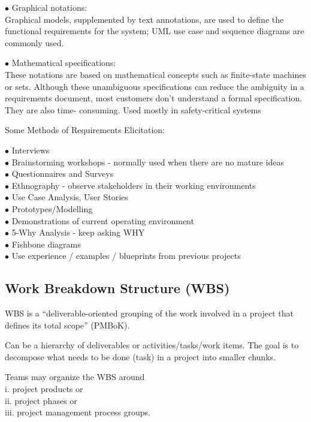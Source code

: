 \documentclass[]{project_plan}
\newcommand{\bulletPoint}{\hspace{-3.1pt}$\bullet$ \hspace{5pt}}
\begin{document}
\bulletPoint Graphical notations:\\
Graphical models, supplemented by text annotations, are used to define the functional
requirements for the system; UML use case and sequence diagrams are commonly used.

\bulletPoint Mathematical specifications:\\
These notations are based on mathematical concepts such as finite-state machines or sets.
Although these unambiguous specifications can reduce the ambiguity in a requirements
document, most customers don’t understand a formal specification. They are also time-
consuming. Used mostly in safety-critical systems

Some Methods of Requirements Elicitation:

\bulletPoint Interviews\\
\bulletPoint Brainstorming workshops - normally used when there are no mature ideas\\
\bulletPoint Questionnaires and Surveys\\
\bulletPoint Ethnography - observe stakeholders in their working environments\\
\bulletPoint Use Case Analysis, User Stories\\
\bulletPoint Prototypes/Modelling\\
\bulletPoint Demonstrations of current operating environment\\
\bulletPoint 5-Why Analysis - keep asking WHY\\
\bulletPoint Fishbone diagrams\\
\bulletPoint Use experience / examples / blueprints from previous projects

\subsection{Work Breakdown Structure (WBS)}

WBS is a “deliverable-oriented grouping of the work involved in a project that defines its total
scope” (PMBoK).

Can be a hierarchy of deliverables or activities/tasks/work items. The goal is to
decompose what needs to be done (task) in a project into smaller chunks.

Teams may organize the WBS around\\
i. project products or\\
ii. project phases or\\
iii. project management process groups.
\end{document}
